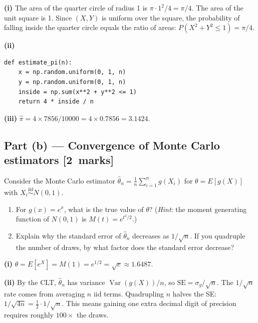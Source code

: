 \documentclass[11pt,a4paper]{article}
\newcommand{\mkpts}[1]{\hfill\textbf{[#1~marks]}}
\begin{document}
\begin{solution}
\textbf{(i)} The area of the quarter circle of radius 1 is $\pi\cdot 1^2/4 = \pi/4$.  The area of the unit square is 1.  Since $(X,Y)$ is uniform over the square, the probability of falling inside the quarter circle equals the ratio of areas: $P(X^2+Y^2\le 1) = \pi/4$.

\medskip

\textbf{(ii)}
\begin{lstlisting}[numbers=none]
def estimate_pi(n):
    x = np.random.uniform(0, 1, n)
    y = np.random.uniform(0, 1, n)
    inside = np.sum(x**2 + y**2 <= 1)
    return 4 * inside / n
\end{lstlisting}

\textbf{(iii)} $\hat{\pi} = 4 \times 7856/10000 = 4 \times 0.7856 = 3.1424$.
\end{solution}

\subsection*{Part (b) --- Convergence of Monte Carlo estimators \mkpts{2}}

Consider the Monte Carlo estimator $\hat{\theta}_n = \frac{1}{n}\sum_{i=1}^{n} g(X_i)$ for $\theta = E[g(X)]$ with $X_i \overset{\text{iid}}{\sim} N(0,1)$.

\begin{enumerate}[label=(\roman*),nosep]
\item For $g(x) = e^x$, what is the true value of $\theta$?  (\textit{Hint}: the moment generating function of $N(0,1)$ is $M(t) = e^{t^2/2}$.)
\item Explain why the standard error of $\hat{\theta}_n$ decreases as $1/\sqrt{n}$.  If you quadruple the number of draws, by what factor does the standard error decrease?
\end{enumerate}

\begin{solution}
\textbf{(i)} $\theta = E[e^X] = M(1) = e^{1/2} = \sqrt{e} \approx 1.6487$.

\medskip

\textbf{(ii)} By the CLT, $\hat{\theta}_n$ has variance $\operatorname{Var}(g(X))/n$, so $\text{SE} = \sigma_g / \sqrt{n}$.  The $1/\sqrt{n}$ rate comes from averaging $n$ iid terms.  Quadrupling $n$ halves the SE: $1/\sqrt{4n} = \tfrac{1}{2}\cdot 1/\sqrt{n}$.  This means gaining one extra decimal digit of precision requires roughly $100\times$ the draws.
\end{solution}
\end{document}
